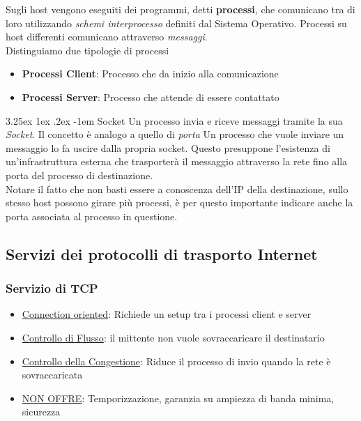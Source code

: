 \documentclass{article}
\makeatletter
\renewcommand\paragraph{\@startsection{paragraph}{5}{\z@}%
  {3.25ex \@plus1ex \@minus.2ex}%
  {-1em}%
  {\normalfont\normalsize\bfseries}}
\makeatother
\begin{document}
            Sugli host vengono eseguiti dei programmi, detti \textbf{processi}, che comunicano tra di loro utilizzando \textit{schemi interprocesso} definiti dal Sistema Operativo. Processi su host differenti comunicano attraverso \textit{messaggi}.\\
            Distinguiamo due tipologie di processi
            \begin{itemize}
                \item \textbf{Processi Client}: Processo che da inizio alla comunicazione
                \item \textbf{Processi Server}: Processo che attende di essere contattato
            \end{itemize}

            \paragraph{Socket} Un processo invia e riceve messaggi tramite la sua \textit{Socket}. Il concetto è analogo a quello di \textit{porta}
            Un processo che vuole inviare un messaggio lo fa uscire dalla propria socket. Questo presuppone l'esistenza di un'infrastruttura esterna che trasporterà il messaggio attraverso la rete fino alla porta del processo di destinazione.\\
            Notare il fatto che non basti essere a conoscenza dell'IP della destinazione, sullo stesso host possono girare più processi, è per questo importante indicare anche la porta associata al processo in questione.

        \subsection{Servizi dei protocolli di trasporto Internet}
            \subsubsection{Servizio di TCP}
                \begin{itemize}
                    \item \underline{Connection oriented}: Richiede un setup tra i processi client e server
                    \item \underline{Controllo di Flusso}: il mittente non vuole sovraccaricare il destinatario
                    \item \underline{Controllo della Congestione}: Riduce il processo di invio quando la rete è sovraccaricata
                    \item \underline{NON OFFRE}: Temporizzazione, garanzia su ampiezza di banda minima, sicurezza 
                \end{itemize}
\end{document}
